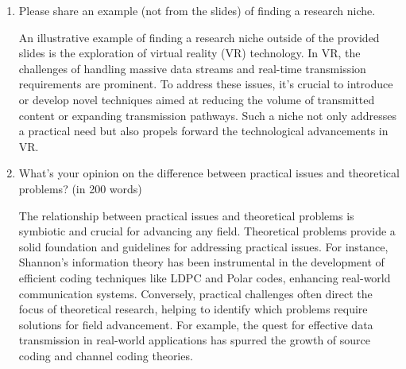 \documentclass[12pt]{article}
\begin{document}
\begin{enumerate}
    \item Please share an example (not from the slides) of finding a research niche.
    
       An illustrative example of finding a research niche outside of the provided slides is the exploration of virtual reality (VR) technology. In VR, the challenges of handling massive data streams and real-time transmission requirements are prominent. To address these issues, it's crucial to introduce or develop novel techniques aimed at reducing the volume of transmitted content or expanding transmission pathways. Such a niche not only addresses a practical need but also propels forward the technological advancements in VR.

    \item What's your opinion on the difference between practical issues and theoretical problems? (in 200 words)
    
       The relationship between practical issues and theoretical problems is symbiotic and crucial for advancing any field. Theoretical problems provide a solid foundation and guidelines for addressing practical issues. For instance, Shannon's information theory has been instrumental in the development of efficient coding techniques like LDPC and Polar codes, enhancing real-world communication systems. Conversely, practical challenges often direct the focus of theoretical research, helping to identify which problems require solutions for field advancement. For example, the quest for effective data transmission in real-world applications has spurred the growth of source coding and channel coding theories.
       
\end{enumerate}
\end{document}
